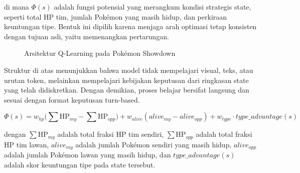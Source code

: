 \documentclass[11pt,a4paper,oneside]{report}
\begin{document}
di mana \(\Phi(s)\) adalah fungsi potensial yang merangkum kondisi strategis state, seperti total HP tim, jumlah Pokémon yang masih hidup, dan perkiraan keuntungan tipe. Bentuk ini dipilih karena menjaga arah optimasi tetap konsisten dengan tujuan asli, yaitu memenangkan pertarungan.

\begin{figure}[h!]
\centering
{}
\caption{Arsitektur Q-Learning pada Pokémon Showdown}
\label{fig:arsitektur}
\end{figure}

Struktur di atas menunjukkan bahwa model tidak mempelajari visual, teks, atau urutan token, melainkan mempelajari kebijakan keputusan dari ringkasan state yang telah didiskretkan. Dengan demikian, proses belajar bersifat langsung dan sesuai dengan format keputusan turn-based.

\begin{equation}
\label{eq:potential-definition}
\Phi(s) = w_{hp}\bigl(\textstyle\sum \text{HP}_{my} - \sum \text{HP}_{opp}\bigr)
        + w_{alive}(alive_{my} - alive_{opp})
        + w_{type} \cdot type\_advantage(s)
\end{equation}

dengan \(\sum \text{HP}_{my}\) adalah total fraksi HP tim sendiri, \(\sum \text{HP}_{opp}\) adalah total fraksi HP tim lawan, \(alive_{my}\) adalah jumlah Pokémon sendiri yang masih hidup, \(alive_{opp}\) adalah jumlah Pokémon lawan yang masih hidup, dan \(type\_advantage(s)\) adalah skor keuntungan tipe pada state tersebut.
\end{document}
